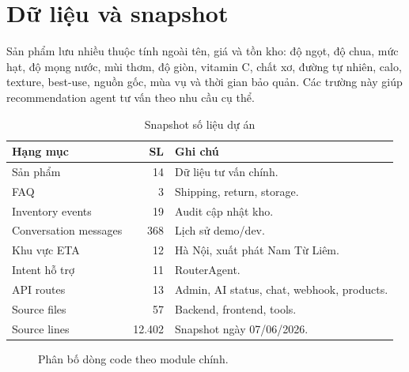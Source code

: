 \documentclass[10pt,a4paper,twocolumn]{article}
\begin{document}
\section{Dữ liệu và snapshot}
Sản phẩm lưu nhiều thuộc tính ngoài tên, giá và tồn kho: độ ngọt, độ chua, mức hạt, độ mọng nước, mùi thơm, độ giòn, vitamin C, chất xơ, đường tự nhiên, calo, texture, best-use, nguồn gốc, mùa vụ và thời gian bảo quản. Các trường này giúp recommendation agent tư vấn theo nhu cầu cụ thể.

\begin{table}[H]
\centering
\caption{Snapshot số liệu dự án}
\label{tab:snapshot}
\scriptsize
\begin{tabularx}{\columnwidth}{@{}L{0.43\columnwidth}rY@{}}
\toprule
\textbf{Hạng mục} & \textbf{SL} & \textbf{Ghi chú} \\
\midrule
Sản phẩm & 14 & Dữ liệu tư vấn chính. \\
FAQ & 3 & Shipping, return, storage. \\
Inventory events & 19 & Audit cập nhật kho. \\
Conversation messages & 368 & Lịch sử demo/dev. \\
Khu vực ETA & 12 & Hà Nội, xuất phát Nam Từ Liêm. \\
Intent hỗ trợ & 11 & RouterAgent. \\
API routes & 13 & Admin, AI status, chat, webhook, products. \\
Source files & 57 & Backend, frontend, tools. \\
Source lines & 12.402 & Snapshot ngày 07/06/2026. \\
\bottomrule
\end{tabularx}
\end{table}

\begin{figure}[H]
\centering
{}
\caption{Phân bố dòng code theo module chính.}
\label{fig:loc}
\end{figure}
\end{document}
